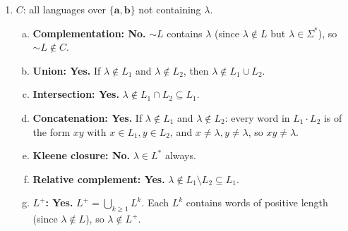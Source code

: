 \begin{enumerate}[{5.}1. ]
\begin{enumerate}[(a)]
  \item \textbf{$J_\Sigma$ closed under $I$?}  $I(L)=L\cap P$.  If $\sim L$ is infinite, $\sim(L\cap P)\supseteq\sim P$ which is infinite (non-primes).  \textbf{Yes, closed.}

  \item \textbf{$\pmb{E}$ closed under $I$?}  If $\pmb{abba}\in L$ and $|\pmb{abba}|=4$ is not prime, then $\pmb{abba}\notin I(L)$.  So $I(L)$ might not contain $\pmb{abba}$.  \textbf{Not closed.}

  \item \textbf{\NSIG\ closed under $I$? No.}  Over $\Sigma=\{\pmb{a}\}$, let
  $P=\{\pmb{a}^p\mid p\text{ prime}\}$ and
  $L=\{\pmb{a}\}^*-P$.  Since $P\notin\DSIG$, Theorem~5.8 implies
  $L\in\NSIG$.  But
  \[
  I(L)=L\cap P=\emptyset\in\DSIG.
  \]
  Hence \NSIG\ is not closed under $I$.
\end{enumerate}

\item $C$: all languages over $\{\pmb{a},\pmb{b}\}$ not containing $\lambda$.

\begin{enumerate}[(a)]
  \item \textbf{Complementation: No.}  $\sim L$ contains $\lambda$ (since $\lambda\notin L$ but $\lambda\in\Sigma^*$), so $\sim L\notin C$.

  \item \textbf{Union: Yes.}  If $\lambda\notin L_1$ and $\lambda\notin L_2$, then $\lambda\notin L_1\cup L_2$.

  \item \textbf{Intersection: Yes.}  $\lambda\notin L_1\cap L_2\subseteq L_1$.

  \item \textbf{Concatenation: Yes.}  If $\lambda\notin L_1$ and $\lambda\notin L_2$: every word in $L_1\cdot L_2$ is of the form $xy$ with $x\in L_1,y\in L_2$, and $x\neq\lambda,y\neq\lambda$, so $xy\neq\lambda$.

  \item \textbf{Kleene closure: No.}  $\lambda\in L^*$ always.

  \item \textbf{Relative complement: Yes.}  $\lambda\notin L_1\setminus L_2\subseteq L_1$.

  \item \textbf{$L^+$: Yes.}  $L^+=\bigcup_{k\ge 1}L^k$.  Each $L^k$ contains words of positive length (since $\lambda\notin L$), so $\lambda\notin L^+$.
\end{enumerate}


\end{enumerate}
